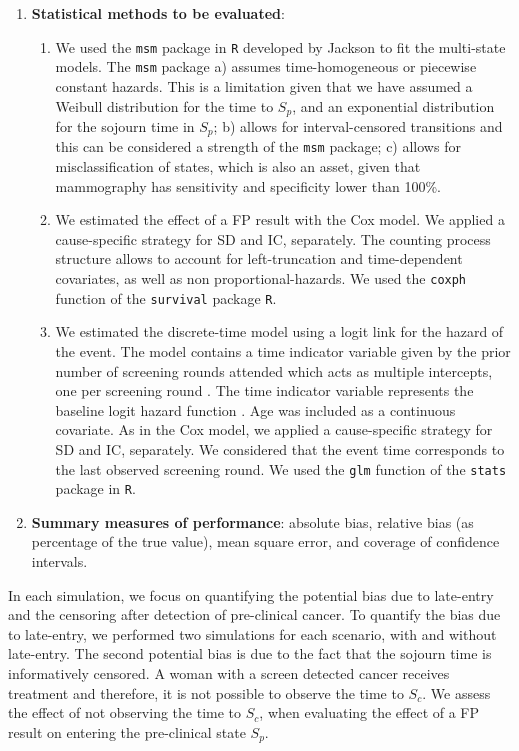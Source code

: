 \documentclass{bmcart}
\begin{document}
\begin{enumerate}
  \item \textbf{Statistical methods to be evaluated}:
  \begin{enumerate}
    \item We used the {\tt msm} package in {\tt R} developed by Jackson \cite{Jackson2011} to fit
    the multi-state models. The {\tt msm} package a) assumes time-homogeneous or piecewise constant
    hazards. This is a limitation given that we have assumed a Weibull distribution for the time to
    $S_p$, and an exponential distribution for the sojourn time in $S_p$; b) allows for interval-censored transitions and this can be considered a strength of the {\tt msm} package; c) allows
    for misclassification of states, which is also an asset, given that mammography has sensitivity
    and specificity lower than 100\%.
    \item We estimated the effect of a FP result with the Cox model. We applied a cause-specific
    strategy for SD and IC, separately. The counting process structure allows to account for
    left-truncation and time-dependent covariates, as well as non proportional-hazards. We used the
    {\tt coxph} function of the {\tt survival} package {\tt R}.
    \item We estimated the discrete-time model using a logit link for the hazard of the event. The
    model contains a time indicator variable given by the prior number of screening rounds attended which
    acts as multiple intercepts, one per screening round \cite{Roman2011b}. The time indicator variable
    represents the baseline logit hazard function \cite{Singer2003}. Age was included as a continuous covariate. As in the Cox model, we
    applied a cause-specific strategy for SD and IC, separately. We considered that the event time
    corresponds to the last observed screening round. We used the {\tt glm} function of the
    {\tt stats} package in {\tt R}.
  \end{enumerate}

  \item \textbf{Summary measures of performance}: absolute bias, relative bias (as percentage of
  the true value), mean square error, and coverage of confidence intervals.
\end{enumerate}

In each simulation, we focus on quantifying the potential bias due to late-entry and the censoring
after detection of pre-clinical cancer. To quantify the bias due to late-entry, we performed two
simulations for each scenario, with and without late-entry. The second potential bias is due to the
fact that the sojourn time is informatively censored. A woman with a screen detected cancer
receives treatment and therefore, it is not possible to observe the time to $S_c$. We assess the
effect of not observing the time to $S_c$, when evaluating the effect of a FP result on entering
the pre-clinical state $S_p$.
\end{document}

